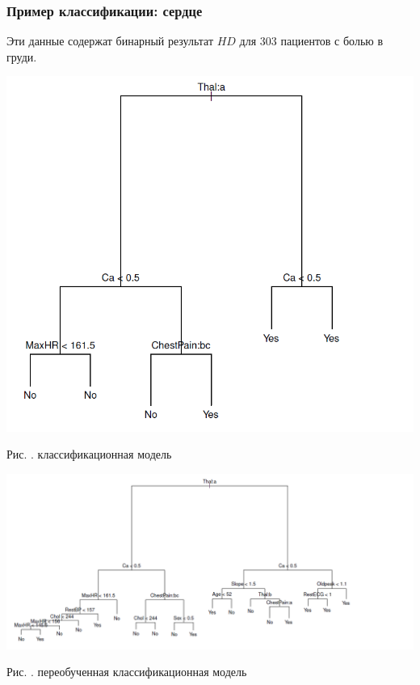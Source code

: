 \documentclass[pdf, 9pt, usenames, dvipsnames, unicode, hyperref={bookmarks=true,bookmarksopen=false, bookmarksnumbered}]{beamer}
\begin{document}
\begin{frame}\frametitle{Пример классификации: сердце}

Эти данные содержат бинарный результат $HD$ для 303 пациентов с болью в груди.

\begin{center}
	\includegraphics[scale=0.25]{pic71}
	
	\begin{center}
	Рис. . классификационная модель
    \end{center}

	\includegraphics[scale=0.2]{pic72}
	
	\begin{center}
	Рис. . переобученная классификационная модель
    \end{center}

\end{center}

\end{frame}
\end{document}
